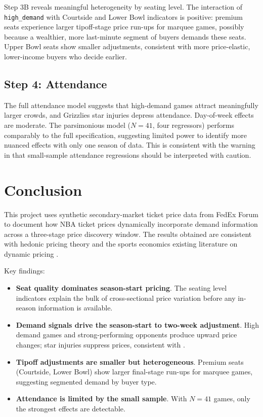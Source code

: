 \documentclass[12pt]{article}
\begin{document}
Step 3B reveals meaningful heterogeneity by seating level. The interaction of \texttt{high\_demand} with Courtside and Lower Bowl indicators is positive: premium seats experience larger tipoff-stage price run-ups for marquee games, possibly because a wealthier, more last-minute segment of buyers demands these seats. Upper Bowl seats show smaller adjustments, consistent with more price-elastic, lower-income buyers who decide earlier.
 
\subsection{Step 4: Attendance}
 
The full attendance model suggests that high-demand games attract meaningfully larger crowds, and Grizzlies star injuries depress attendance. Day-of-week effects are moderate. The parsimonious model ($N = 41$, four regressors) performs comparably to the full specification, suggesting limited power to identify more nuanced effects with only one season of data. This is consistent with the warning in \citet{drayer2012dynamic} that small-sample attendance regressions should be interpreted with caution.
 
 
\section{Conclusion}
\label{sec:conclusion}
 
This project uses synthetic secondary-market ticket price data from FedEx Forum to document how NBA ticket prices dynamically incorporate demand information across a three-stage price discovery window. The results obtained are consistent with hedonic pricing theory \citep{rosen1974hedonic} and the sports economics existing literature on dynamic pricing \citep{drayer2012dynamic, courty2020variable}.
 
Key findings:
\begin{itemize}
    \item \textbf{Seat quality dominates season-start pricing}. The seating level indicators explain the bulk of cross-sectional price variation before any in-season information is available.
    \item \textbf{Demand signals drive the season-start to two-week adjustment}. High demand games and strong-performing opponents produce upward price changes; star injuries suppress prices, consistent with \citet{Kaplan2019}.
    \item \textbf{Tipoff adjustments are smaller but heterogeneous}. Premium seats (Courtside, Lower Bowl) show larger final-stage run-ups for marquee games, suggesting segmented demand by buyer type.
    \item \textbf{Attendance is limited by the small sample}. With $N = 41$ games, only the strongest effects are detectable.
\end{itemize}
 
\end{document}
